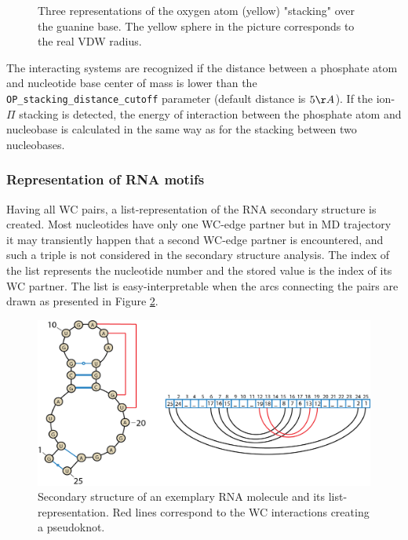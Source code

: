 \documentclass[12pt]{article}
\begin{document}
\begin{figure}[h!]
\begin{center}
{\label{stackingPiexample3}}
\caption{Three representations of the oxygen atom (yellow) "stacking" over the guanine base. The yellow sphere in the \label{stackingPiexample1} picture corresponds to the real VDW radius.}
\label{stackingPiExamples}
\end{center}
\end{figure}
The interacting systems are recognized if the distance between a phosphate atom and nucleotide base center of mass is lower than the {\tt OP\_stacking\_distance\_cutoff} parameter (default distance is $ 5 \AA$). If the ion-$\Pi$ stacking is detected, the energy of interaction between the phosphate atom and nucleobase is calculated in the same way as for the stacking between two nucleobases. 

\subsubsection{Representation of RNA motifs}
Having all WC pairs, a list-representation of the RNA secondary structure is created. 
Most nucleotides have only one WC-edge partner but in MD trajectory it may transiently happen that a second WC-edge partner is encountered, and such a triple is not considered in the secondary structure analysis. 
The index of the list represents the nucleotide number and the stored value is the index of its WC partner. The list is easy-interpretable when the arcs connecting the pairs are drawn as  presented in Figure \ref{SecondaryStructureList}. 

\begin{figure}[h!]
\centering
\includegraphics[width = \textwidth]{./pictures/PseudoKnotArchs.png}
\caption{Secondary structure of an exemplary RNA molecule and its list-representation. Red lines correspond to the WC interactions creating a pseudoknot.}
\label{SecondaryStructureList}
\end{figure}
\end{document}
